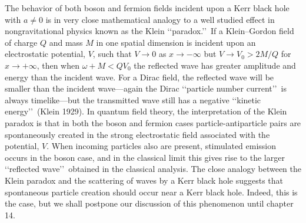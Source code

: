 The behavior of both boson and fermion fields incident upon a Kerr black hole with
\(a\ne0\) is in very close mathematical analogy to a well studied effect in
nongravitational physics known as the Klein \lq\lq paradox.\rq\rq\ If a Klein--Gordon
field of charge \(Q\) and mass \(M\) in one spatial dimension is incident upon an
electrostatic potential, \(V\), such that \(V\to0\) as \(x\to-\infty\) but
\(V\to V_0>2M/Q\) for \(x\to+\infty\), then when \(\omega+M<QV_0\) the reflected
wave has greater amplitude and energy than the incident wave. For a Dirac field, the
reflected wave will be smaller than the incident wave---again the Dirac \lq\lq particle
number current\rq\rq\ is always timelike---but the transmitted wave still has a
negative \lq\lq kinetic energy\rq\rq\ (Klein 1929). In quantum field theory, the
interpretation of the Klein paradox is that in both the boson and fermion cases
particle-antiparticle pairs are spontaneously created in the strong electrostatic field
associated with the potential, \(V\). When incoming particles also are present,
stimulated emission occurs in the boson case, and in the classical limit this gives rise
to the larger \lq\lq reflected wave\rq\rq\ obtained in the classical analysis. The close
analogy between the Klein paradox and the scattering of waves by a Kerr black hole
suggests that spontaneous particle creation should occur near a Kerr black hole.
Indeed, this is the case, but we shall postpone our discussion of this phenomenon
until chapter 14.
